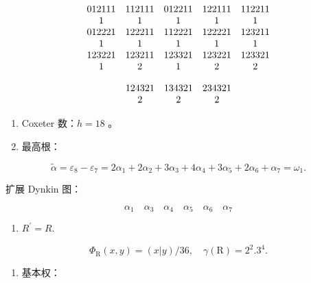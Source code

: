 \[
\begin{array}{c c c c c} 0   1   2   1   1   1 & 1   1   2   1   1   1 & 0   1   2   2   1   1 & 1   2   2   1   1   1 & 1   1   2   2   1   1 \\ 1 & 1 & 1 & 1 & 1 \\ 0   1   2   2   2   1 & 1   2   2   2   1   1 & 1   1   2   2   2   1 & 1   2   2   2   2   1 & 1   2   3   2   1   1 \\ 1 & 1 & 1 & 1 & 1 \\ 1   2   3   2   2   1 & 1   2   3   2   1   1 & 1   2   3   3   2   1 & 1   2   3   2   2   1 & 1   2   3   3   2   1 \\ 1 & 2 & 1 & 2 & 2 \end{array}
\]

\[
\begin{array}{c c c} 1 2 4 3 2 1 & 1 3 4 3 2 1 & 2 3 4 3 2 1 \\ 2 & 2 & 2 \end{array}
\]

\begin{enumerate}
\def\labelenumi{(\Roman{enumi})}
\setcounter{enumi}{2}
\item
  Coxeter 数：\(h = 18\) 。
\item
  最高根：
\end{enumerate}

\[
\tilde {\alpha} = \varepsilon_ {8} - \varepsilon_ {7} = 2 \alpha_ {1} + 2 \alpha_ {2} + 3 \alpha_ {3} + 4 \alpha_ {4} + 3 \alpha_ {5} + 2 \alpha_ {6} + \alpha_ {7} = \omega_ {1}.
\]

扩展 Dynkin 图：

\[
\alpha_ {1} \quad \alpha_ {3} \quad \alpha_ {4} \quad \alpha_ {5} \quad \alpha_ {6} \quad \alpha_ {7}
\]

\begin{enumerate}
\def\labelenumi{(\Alph{enumi})}
\setcounter{enumi}{21}
\tightlist
\item
  \(R^{\prime} = R.\)
\end{enumerate}

\[
  \Phi_ {\mathrm{R}} (x, y) = (x | y) / 36, \quad \gamma (\mathrm{R}) = 2 ^ {2}. 3 ^ {4}.
\]

\begin{enumerate}
\def\labelenumi{(\Roman{enumi})}
\setcounter{enumi}{5}
\tightlist
\item
  基本权：
\end{enumerate}

